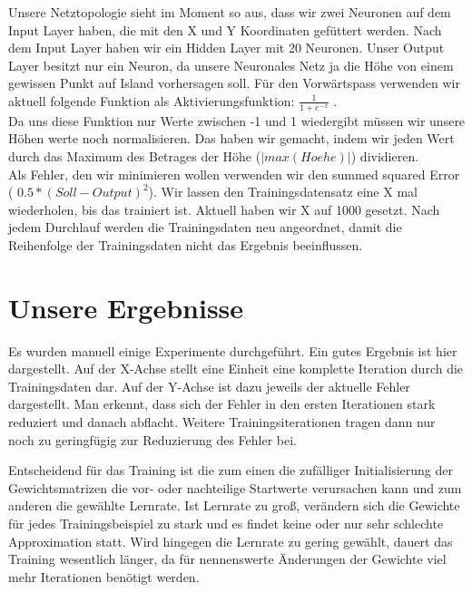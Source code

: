 \documentclass{hbrs-ecta-report}
\begin{document}
Unsere Netztopologie sieht im Moment so aus, dass wir zwei Neuronen auf dem Input Layer haben, die mit den X und Y Koordinaten gefüttert werden. Nach dem Input Layer haben wir ein Hidden Layer mit 20 Neuronen. Unser Output Layer besitzt nur ein Neuron, da unsere Neuronales Netz ja die Höhe von einem gewissen Punkt auf Island vorhersagen soll.
Für den Vorwärtspass verwenden wir aktuell folgende Funktion als Aktivierungsfunktion: $\frac{1}{1+e^{-x}}$ .\\
Da uns diese Funktion nur Werte zwischen -1 und 1 wiedergibt müssen wir unsere Höhen werte noch normalisieren. Das haben wir gemacht, indem wir jeden Wert durch das Maximum des Betrages der Höhe ($ |max(Hoehe)| $) dividieren.\\
Als Fehler, den wir minimieren wollen verwenden wir den summed squared Error ( $ 0.5*(Soll-Output)^2 $). Wir lassen den Trainingsdatensatz eine X mal wiederholen, bis das trainiert ist. Aktuell haben wir X auf 1000 gesetzt. Nach jedem Durchlauf werden die Trainingsdaten neu angeordnet, damit die Reihenfolge der Trainingsdaten nicht das Ergebnis beeinflussen.

\section{Unsere Ergebnisse}

Es wurden manuell einige Experimente durchgeführt. Ein gutes Ergebnis ist hier dargestellt.
Auf der X-Achse stellt eine Einheit eine komplette Iteration durch die Trainingsdaten dar. Auf der Y-Achse ist dazu jeweils der aktuelle Fehler dargestellt. \newline
Man erkennt, dass sich der Fehler in den ersten Iterationen stark reduziert und danach abflacht. Weitere Trainingsiterationen tragen dann nur noch zu geringfügig zur Reduzierung des Fehler bei.

Entscheidend für das Training ist die zum einen die zufälliger Initialisierung der Gewichtsmatrizen die vor- oder nachteilige Startwerte verursachen kann und zum anderen die gewählte Lernrate. Ist Lernrate zu groß, verändern sich die Gewichte für jedes Trainingsbeispiel zu stark und es findet keine oder nur sehr schlechte Approximation statt. Wird hingegen die Lernrate zu gering gewählt, dauert das Training wesentlich länger, da für nennenswerte Änderungen der Gewichte viel mehr Iterationen benötigt werden.   
\end{document}
